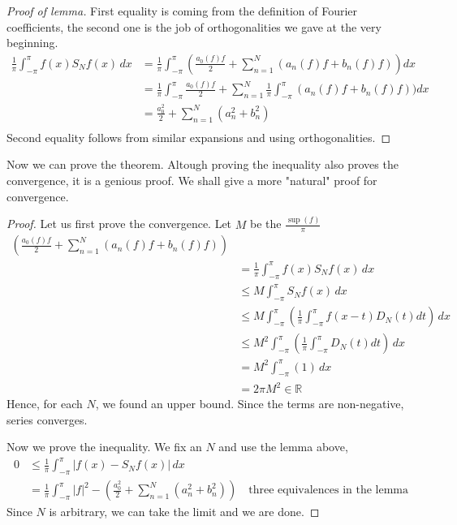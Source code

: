 \documentclass[12pt]{amsart}
\theoremstyle{definition}
\begin{document}
 \begin{proof}[Proof of lemma]
 First equality is coming from the definition of Fourier coefficients, the second one is the job of orthogonalities we gave at the very beginning.
 \[
 \begin{aligned}
     \frac{1}{\pi} \int_{-\pi}^{\pi} f(x)S_Nf(x) \, dx
         &= \frac{1}{\pi} \int_{-\pi}^{\pi} (\frac{a_0(f)f}{2} + \sum_{n=1}^{N} \left(a_n(f)f +
         b_n(f)f\right))dx \\
         &= \frac{1}{\pi} \int_{-\pi}^{\pi}\frac{a_0(f)f}{2} + \sum_{n=1}^{N} \frac{1}{\pi} \int_{-\pi}^{\pi} \left(a_n(f)f +
         b_n(f)f\right))dx \\
         &= \frac{a_0^2}{2} + \sum_{n=1}^{N} \left(a_n^2 +
         b_n^2\right)\\
 \end{aligned}
 \]
 Second equality follows from similar expansions and using orthogonalities.

 \end{proof}


    Now we can prove the theorem. Altough proving the inequality also proves the convergence, it is a genious proof. We shall give a more "natural" proof for convergence.


    \begin{proof}
        Let us first prove the convergence. Let $M$ be the $\frac{\sup(f)}{\pi}$
        \[
        \begin{aligned}
            (\frac{a_0(f)f}{2} + \sum_{n=1}^{N} \left(a_n(f)f +
         b_n(f)f\right)) \\
         &=  \frac{1}{\pi} \int_{-\pi}^{\pi} f(x)S_Nf(x) \, dx \\
         &\leq M \int_{-\pi}^{\pi}S_Nf(x) \, dx \\
         &\leq M \int_{-\pi}^{\pi}(\frac{1}{\pi} \int_{-\pi}^{\pi}f(x-t)D_N(t)dt) \, dx \\
         &\leq M^2  \int_{-\pi}^{\pi}(\frac{1}{\pi} \int_{-\pi}^{\pi}D_N(t)dt) \, dx \\
         &= M^2  \int_{-\pi}^{\pi}(1) \, dx \\
         &= 2\pi M^2 \in \mathbb{R}
        \end{aligned}
        \]
        Hence, for each $N$, we found an upper bound. Since the terms are non-negative, series converges.

        Now we prove the inequality.
        We fix an $N$ and use the lemma above,
        \[
        \begin{aligned}
            0
            &\leq \frac{1}{\pi} \int_{-\pi}^{\pi} |f(x)-S_Nf(x)| \, dx \\
            &= \frac{1}{\pi} \int_{-\pi}^{\pi}|f|^2 - \left( \frac{a_0^2}{2} + \sum_{n=1}^{N} \left(a_n^2 + b_n^2\right) \right) \quad \text{three equivalences in the lemma}
        \end{aligned}
        \]
        Since $N$ is arbitrary, we can take the limit and we are done.
    \end{proof}
\end{document}
